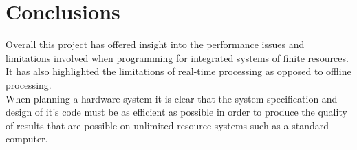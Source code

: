 \documentclass[titlepage]{scrartcl}
\begin{document}
    \section{Conclusions}
    Overall this project has offered insight into the performance issues and
    limitations involved when programming for integrated systems of finite
    resources. It has also highlighted the limitations of real-time processing
    as opposed to offline processing.\\
    When planning a hardware system it is clear that the system specification
    and design of it's code must be as efficient as possible in order to
    produce the quality of results that are possible on unlimited resource
    systems such as a standard computer.
    \printbibliography
\end{document}
